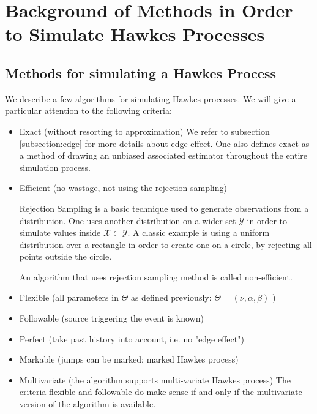 \chapter{Background of Methods in Order to Simulate Hawkes Processes}
\label{appendix_simulate}


\section{Methods for simulating a Hawkes Process}
\label{section:definition_algo}
We describe a few algorithms for simulating Hawkes processes. We will give a particular attention to the following criteria:

\begin{itemize}
\setlength{\itemindent}{2 cm}
\item Exact (without resorting to approximation)
We refer to subsection \ref{subsection:edge} for more details about edge effect. One also defines exact as a method of drawing an unbiased associated estimator throughout the entire simulation process. 
\item Efficient (no wastage, not using the rejection sampling)

\begin{definition}
Rejection Sampling is a basic technique used to generate observations from a distribution. One uses another distribution on a wider set $\mathcal Y$ in order to simulate values inside $\mathcal X \subset \mathcal Y$. A classic example is using a uniform distribution over a rectangle in order to create one on a circle, by rejecting all points outside the circle. 
\end{definition}

An algorithm that uses rejection sampling method is called non-efficient. 

\item Flexible (all parameters in $\Theta$ as defined previously: $ \Theta = ( \nu, \alpha, \beta ) $ )
\item Followable (source triggering the event is known)
\item Perfect (take past history into account, i.e. no "edge effect")
\item Markable (jumps can be marked; marked Hawkes process)
\item Multivariate (the algorithm supports multi-variate Hawkes process)
The criteria flexible and followable do make sense if and only if the multivariate version of the algorithm is available.
\end{itemize}


